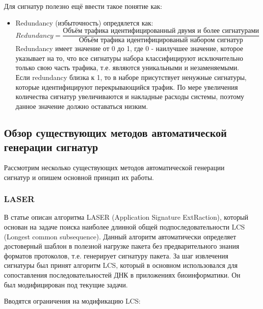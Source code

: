 Для сигнатур полезно ещё ввести такое понятие как:

\begin{itemize}
    \item Redundancy (избыточность) опредялется как:
    $$ \textit{Redundancy} = \frac{\text{Объём трафика идентифицированный двумя и более сигнатурами}}{\text{Объём трафика идентифицированый набором сигнатур}}$$
    Redundancy имеет значение от 0 до 1, где 0 - наилучшее значение, которое указывает на то, что все сигнатуры набора классифицируют исключительно только свою часть трафика,
    т.е. являются уникальными и незаменяемыми. Если redundancy близка к 1, то в наборе присутствует ненужные сигнатуры, которые идентифицируют перекрывающийся трафик.
    По мере увеличения количества сигнатур увеличиваются и накладные расходы системы, поэтому данное значение должно оставаться низким.
\end{itemize}

\subsection{Обзор существующих методов автоматической генерации сигнатур}

Рассмотрим несколько существующих методов автоматической генерации сигнатур и опишем основной принцип их работы.

\subsubsection{LASER}

В статье \cite{park2008towards} описан алгоритма LASER (Application Signature ExtRaction),
который основан на задаче поиска наиболее длинной общей подпоследовательности LCS (Longest common subsequence).
Данный алгоритм автоматически определяет достоверный шаблон в полезной нагрузке пакета без предварительного знания форматов протоколов, т.е. генерирует сигнатуру пакета.
За шаг извлечения сигнатуры был принят алгоритм LCS, который в основном использовался для сопоставления последовательностей ДНК в приложениях биоинформатики.
Он был модифицирован под текущие задачи.

Вводятся ограничения на модификацию LCS:

